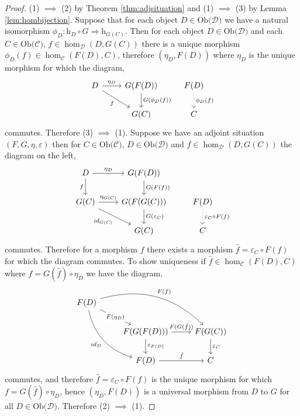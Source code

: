 \documentclass[11pt,a4paper]{article}
\theoremstyle{definition}
\newcommand\ho[3][]{\hom_{#1}(#2,#3)}
\newcommand\ob[1]{\mathrm{Ob(}#1\mathrm{)}}
\newcommand\cat[1]{\mathscr{#1}}
\newcommand\nattran[3]{#1\colon#2\Rightarrow#3}
\numberwithin{equation}{section}
\begin{document}
\begin{proof}
    (1) $\implies$ (2) by Theorem \ref{thm:adjsituation} and (1) $\implies$ (3) by Lemma \ref{lem:hombijection}. Suppose that for each object $D\in\ob{\cat{D}}$ we have a natural isomorphism $\nattran{\phi_{D}}{\mathrm{h}_{D}\circ G}{\mathrm{h}_{G(C)}}$. Then for each object $D\in\ob{\cat{D}}$ and each $C\in\ob{\cat{C}}$, $f\in\ho[\cat{D}]{D}{G(C)}$ there is a unique morphism $\phi_{D}(f)\in\ho[\cat{C}]{F(D)}{C}$, therefore $(\eta_{D},F(D))$ where $\eta_{D}$ is the unique morphism for which the diagram,
    \begin{equation*}
    \begin{tikzcd}
    D \arrow[r, "\eta_{D}"] \arrow[rd, "f"'] & G(F(D)) \arrow[d, "G(\phi_{D}(f))"] & F(D) \arrow[d,dotted,"\phi_{D}(f)"] \\
    & G(C) & C
    \end{tikzcd}
    \end{equation*}
    commutes. Therefore (3) $\implies$ (1).
    Suppose we have an adjoint situation $(F,G,\eta,\varepsilon)$ then for $C\in\ob{\cat{C}}$, $D\in\ob{\cat{D}}$ and $f\in\ho[\cat{D}]{D}{G(C)}$ the diagram on the left,
    \begin{equation*}
    \begin{tikzcd}
    D \arrow[d, "f"'] \arrow[r , "\eta_{D}"] & G(F(D)) \arrow[d,"G(F(f))"] \\
    G(C) \arrow[r, "\eta_{G(C)}"] \arrow[dr, "id_{G(C)}"'] & G(F(G(C))) \arrow[d, "G(\varepsilon_{C})"] & F(D) \arrow[d,"\varepsilon_{C} \circ F(f)", dotted] \\
    & G(C) & C
    \end{tikzcd}
    \end{equation*}
    commutes. Therefore for a morphism $f$ there exists a morphism $\hat{f}=\varepsilon_{C}\circ F(f)$ for which the diagram commutes. To show uniqueness if  $\hat{f}\in\ho[\cat{C}]{F(D)}{C}$ where $f= G(\hat{f})\circ \eta_D$ we have the diagram,
    \begin{equation*}
    \begin{tikzcd}
    F(D)\arrow[bend left]{drr}{F(f)} \arrow[bend right]{ddr}[swap]{id_{D}} \arrow[]{dr}[description]{F(\eta_{D})} & & \\
    & F(G(F(D))) \arrow{r}{F(G(\hat{f}))} \arrow{d}{\varepsilon_{F(D)}} & F(G(C)) \arrow{d}{\varepsilon_{C}} \\ & F(D) \arrow{r}{\hat{f}} & C
    \end{tikzcd}
    \end{equation*}
    commutes, and therefore $\hat{f} = \varepsilon_{C}\circ F(f)$ is the unique morphism for which $f= G(\hat{f})\circ \eta_D$, hence $(\eta_{D},F(D))$ is a universal morphism from $D$ to $G$ for all $D\in\ob{\cat{D}}$.
    Therefore (2) $\implies$ (1).
\end{proof}
\end{document}

